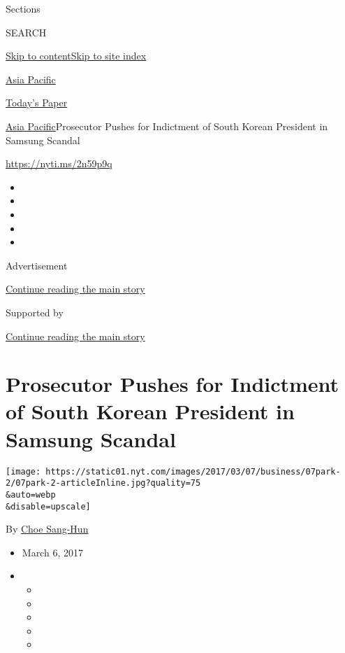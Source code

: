 Sections

SEARCH

\protect\hyperlink{site-content}{Skip to
content}\protect\hyperlink{site-index}{Skip to site index}

\href{https://www.nytimes.com/section/world/asia}{Asia Pacific}

\href{https://myaccount.nytimes.com/auth/login?response_type=cookie\&client_id=vi}{}

\href{https://www.nytimes.com/section/todayspaper}{Today's Paper}

\href{/section/world/asia}{Asia Pacific}\textbar{}Prosecutor Pushes for
Indictment of South Korean President in Samsung Scandal

\url{https://nyti.ms/2n59p9q}

\begin{itemize}
\item
\item
\item
\item
\item
\end{itemize}

Advertisement

\protect\hyperlink{after-top}{Continue reading the main story}

Supported by

\protect\hyperlink{after-sponsor}{Continue reading the main story}

\hypertarget{prosecutor-pushes-for-indictment-of-south-korean-president-in-samsung-scandal}{%
\section{Prosecutor Pushes for Indictment of South Korean President in
Samsung
Scandal}\label{prosecutor-pushes-for-indictment-of-south-korean-president-in-samsung-scandal}}

\texttt{[image: https://static01.nyt.com/images/2017/03/07/business/07park-2/07park-2-articleInline.jpg?quality=75\\\&auto=webp\\\&disable=upscale]}

By \href{http://www.nytimes.com/by/choe-sang-hun}{Choe Sang-Hun}

\begin{itemize}
\item
  March 6, 2017
\item
  \begin{itemize}
  \item
  \item
  \item
  \item
  \item
  \end{itemize}
\end{itemize}


